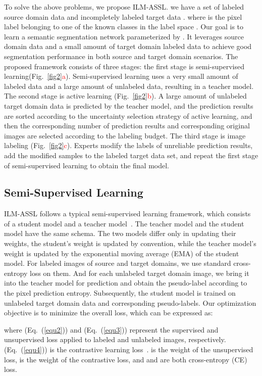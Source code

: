 \documentclass[journal]{IEEEtran}
\newcommand{\eref}[1]{Eq.~(\ref{#1})}
\newcommand{\fref}[1]{Fig.~\ref{#1}}
\newcommand{\method}{ILM-ASSL\xspace}
\newcommand{\ssl}{semi-supervised learning\xspace}
\begin{document}
To solve the above problems, we propose \method. we have a set of labeled source domain data  and incompletely labeled target data . where  is the pixel label belonging to one of the  known classes in the label space . Our goal is to learn a semantic segmentation network  parameterized by . It leverages source domain data and a small amount of target domain labeled data to achieve good segmentation performance in both source and target domain scenarios. The proposed framework consists of three stages: the first stage is \ssl (\fref{fig2}\textcolor{red}{a}). Semi-supervised learning uses a very small amount of labeled data and a large amount of unlabeled data, resulting in a teacher model. The second stage is active learning (\fref{fig2}\textcolor{red}{b}). A large amount of unlabeled target domain data is predicted by the teacher model, and the prediction results are sorted according to the uncertainty selection strategy of active learning, and then the corresponding number of prediction results and corresponding original images are selected according to the labeling budget. The third stage is image labeling (\fref{fig2}\textcolor{red}{c}). Experts modify the labels of unreliable prediction results, add the modified samples to the labeled target data set, and repeat the first stage of semi-supervised learning to obtain the final model.


\subsection{Semi-Supervised Learning}
\label{sec:semi-supervised learning}

\method follows a typical \ssl framework, which consists of a student model and a teacher model~\cite{hoyer2022daformer}. The teacher model and the student model have the same schema. The two models differ only in updating their weights, the student's weight  is updated by convention, while the teacher model's weight  is updated by the exponential moving average (EMA) of the student model. For labeled images of source and target domains, we use standard cross-entropy loss on them. And for each unlabeled target domain image, we bring it into the teacher model for prediction and obtain the pseudo-label according to the pixel prediction entropy. Subsequently, the student model is trained on unlabeled target domain data and corresponding pseudo-labels. Our optimization objective is to minimize the overall loss, which can be expressed as:

where  (\eref{equ2}) and  (\eref{equ3}) represent the supervised and unsupervised loss applied to labeled and unlabeled images, respectively.  (\eref{equ4}) is the contrastive learning loss~\cite{oord2018representation}.  is the weight of the unsupervised loss,  is the weight of the contrastive loss, and  and  are both cross-entropy (CE) loss.
\end{document}
